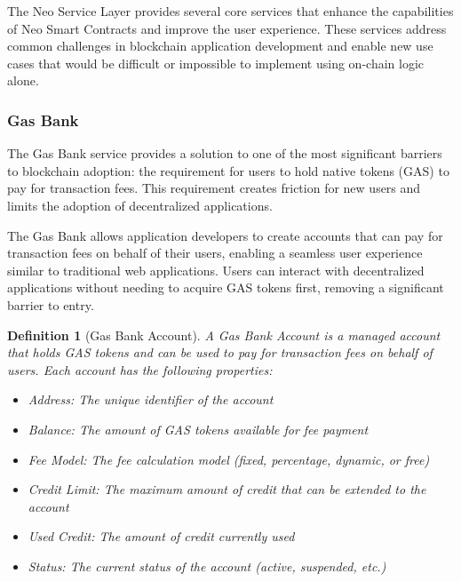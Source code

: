 \documentclass[11pt]{article}
\newtheorem{definition}{Definition}
\begin{document}
The Neo Service Layer provides several core services that enhance the capabilities of Neo Smart Contracts and improve the user experience. These services address common challenges in blockchain application development and enable new use cases that would be difficult or impossible to implement using on-chain logic alone.

\subsubsection{Gas Bank}
\label{subsubsec:gas-bank}

The Gas Bank service provides a solution to one of the most significant barriers to blockchain adoption: the requirement for users to hold native tokens (GAS) to pay for transaction fees. This requirement creates friction for new users and limits the adoption of decentralized applications.



The Gas Bank allows application developers to create accounts that can pay for transaction fees on behalf of their users, enabling a seamless user experience similar to traditional web applications. Users can interact with decentralized applications without needing to acquire GAS tokens first, removing a significant barrier to entry.

\begin{definition}[Gas Bank Account]
A Gas Bank Account is a managed account that holds GAS tokens and can be used to pay for transaction fees on behalf of users. Each account has the following properties:
\begin{itemize}
    \item Address: The unique identifier of the account
    \item Balance: The amount of GAS tokens available for fee payment
    \item Fee Model: The fee calculation model (fixed, percentage, dynamic, or free)
    \item Credit Limit: The maximum amount of credit that can be extended to the account
    \item Used Credit: The amount of credit currently used
    \item Status: The current status of the account (active, suspended, etc.)
\end{itemize}
\end{definition}
\end{document}
